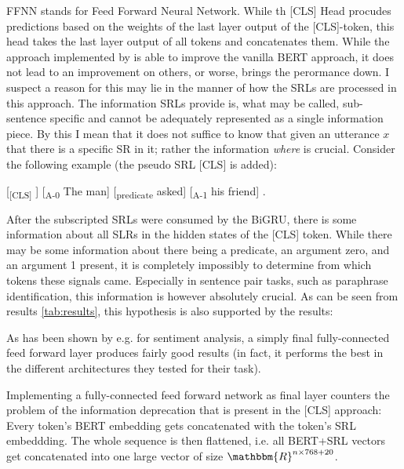 FFNN stands for Feed Forward Neural Network. While th [CLS] Head procudes predictions based on the
weights of the last layer output of the [CLS]-token, this head takes the last layer output of all
tokens and concatenates them.
While the approach implemented by \cite{zhang2019semantics} is able to improve the vanilla
BERT approach, it does not lead to an improvement on others, or worse, brings the perormance
down. I suspect a reason for this may lie in the manner of how the SRLs are processed in this
approach. The information SRLs provide is, what may be called, sub-sentence specific and
cannot be adequately represented as a single information piece. By this I mean that it does
not suffice to know that given an utterance $x$ that there is a specific SR in it; rather the
information \emph{where} is crucial. Consider the following example (the pseudo SRL [CLS] is
added):


[\textsubscript{[CLS]} ] [\textsubscript{A-0} The man] [\textsubscript{predicate} asked] [\textsubscript{A-1} his friend] .

After the subscripted SRLs were consumed by the BiGRU, there is some information about all
SLRs in the hidden states of the [CLS] token. While there may be some information about there
being a predicate, an argument zero, and an argument 1 present, it is completely impossibly
to determine from which tokens these signals came. Especially in sentence pair tasks, such
as paraphrase identification, this information is however absolutely crucial. As can be seen
from results \ref{tab:results}, this hypothesis is also supported by the results:


As has been shown by e.g. \cite{myagmar2019transferable} for sentiment analysis, a simply final
fully-connected feed forward layer produces fairly good results (in fact, it performs the best
in the different architectures they tested for their task).

Implementing a fully-connected feed forward network as final layer counters the problem of the
information deprecation that is present in the [CLS] approach: Every token's BERT embedding gets
concatenated with the token's SRL embeddding. The whole sequence is then flattened, i.e. all
BERT+SRL vectors get concatenated into one large vector of size $\mathbbm{R}^{n\times768+20}$.


